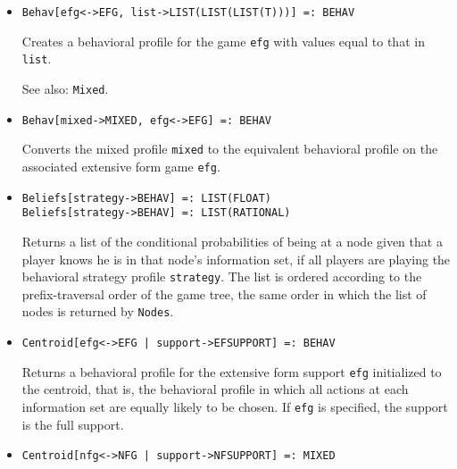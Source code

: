 \begin{itemize}


\item
\protect \large \begin{verbatim}
Behav[efg<->EFG, list->LIST(LIST(LIST(T)))] =: BEHAV
\end{verbatim}\normalsize

\bd
Creates a behavioral profile for the game \verb+efg+ with values equal
to that in \verb+list+.  
\item
[See also:] {\tt Mixed}.
\ed

\item
\protect \large \begin{verbatim}
Behav[mixed->MIXED, efg<->EFG] =: BEHAV
\end{verbatim}\normalsize

\bd
Converts the mixed profile \verb+mixed+ to the equivalent
behavioral profile on the associated extensive form game \verb+efg+.
\ed

\item
\protect \large \begin{verbatim}
Beliefs[strategy->BEHAV] =: LIST(FLOAT)
Beliefs[strategy->BEHAV] =: LIST(RATIONAL)
\end{verbatim}\normalsize

\bd
Returns a list of the conditional probabilities of
being at a node given that a player knows he is in that node's information
set, if all players are playing the behavioral strategy profile
\verb+strategy+.  The list is ordered according to the prefix-traversal
order of the game tree, the same order in which the list of nodes is
returned by {\tt Nodes}.
\ed



\item
\protect \large \begin{verbatim} 
Centroid[efg<->EFG | support->EFSUPPORT] =: BEHAV
\end{verbatim}\normalsize

\bd
Returns a behavioral profile for the extensive form
support \verb+efg+ initialized to the centroid, that is, the behavioral
profile in which all actions at each information set are equally
likely to be chosen.  If \verb+efg+ is specified, the support is the
full support.  
\ed

\item
\protect \large \begin{verbatim}
Centroid[nfg<->NFG | support->NFSUPPORT] =: MIXED
\end{verbatim}\normalsize


\end{itemize}
